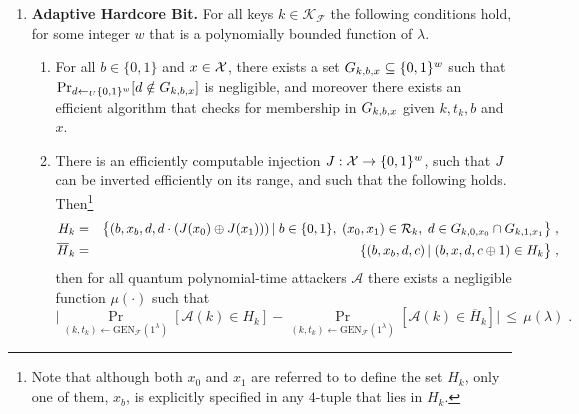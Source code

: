 \begin{definition}
\begin{enumerate}
\begin{enumerate}
\end{enumerate}


\item{\textbf{Adaptive Hardcore Bit.}}
For all keys $k\in \mathcal{K}_{\mathcal{F}}$ the following conditions hold, for some integer $w$ that is a polynomially bounded function of $\lambda$. 
\begin{enumerate}
\item For all $b\in \{0,1\}$ and $x\in \mathcal{X}$, there exists a set $G_{k,b,x}\subseteq \{0,1\}^{w}$ such that $\Pr_{d\leftarrow_U \{0,1\}^w}[d\notin G_{k,b,x}]$ is negligible, and moreover there exists an efficient algorithm that checks for membership in $G_{k,b,x}$ given $k,t_k,b$ and $x$. 
\item There is an efficiently computable injection $J:\mathcal{X}\to \{0,1\}^w$, such that $J$ can be inverted efficiently on its range, and such that the following holds. Then\footnote{Note that although both $x_0$ and $x_1$ are referred to to define the set $H_k$, only one of them, $x_b$, is explicitly specified in any $4$-tuple that lies in $H_k$.}
\begin{eqnarray*}\label{eq:defsetsH}
H_k &=& \big\{(b,x_b,d,d\cdot(J(x_0)\oplus J(x_1)))\,|\; b\in \{0,1\},\; (x_0,x_1)\in \mathcal{R}_k,\; d\in G_{k,0,x_0}\cap G_{k,1,x_1}\big\}\;,\\
\overline{H}_k &=& \{(b,x_b,d,c)\,|\; (b,x,d,c\oplus 1) \in H_k\big\}\;,
\end{eqnarray*}
then for all quantum polynomial-time attackers $\mathcal{A}$ there exists a negligible function $\mu(\cdot)$ such that 
\begin{equation}\label{eq:adaptive-hardcore}
\Big|\Pr_{(k,t_k)\leftarrow \textrm{GEN}_{\mathcal{F}}(1^{\lambda})}[\mathcal{A}(k) \in H_k] - \Pr_{(k,t_k)\leftarrow \textrm{GEN}_{\mathcal{F}}(1^{\lambda})}[\mathcal{A}(k) \in\overline{H}_k]\Big| \,\leq\, \mu(\lambda)\;.
\end{equation}
\end{enumerate}




\end{enumerate}
\end{definition}